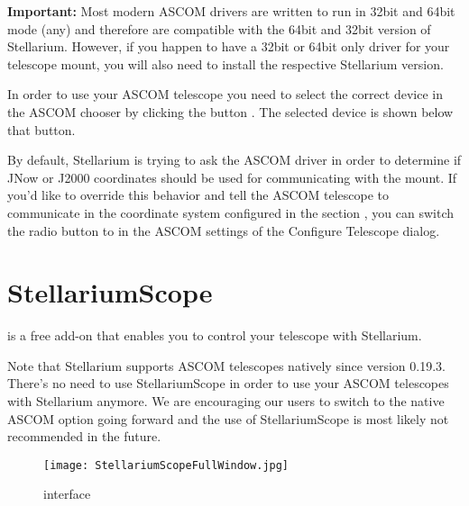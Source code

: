 \textbf{Important:} Most modern ASCOM drivers are written to run in 32bit and 64bit mode (any) and therefore are 
compatible with the 64bit and 32bit version of Stellarium. However, if you happen to have a 32bit or 64bit only
driver for your telescope mount, you will also need to install the respective Stellarium version.

In order to use your ASCOM telescope you need to select the correct device in the ASCOM chooser by clicking
the button . The selected device is shown below that button.

By default, Stellarium is trying to ask the ASCOM driver in order to determine if JNow or J2000 coordinates 
should be used for communicating with the mount. If you'd like to override this behavior and tell the ASCOM telescope
to communicate in the coordinate system configured in the section , you can
switch the radio button  to  in the ASCOM settings of 
the Configure Telescope dialog.

\section{StellariumScope}
\label{sec:plugins:StellariumScope}
 is a free add-on that enables you to control your telescope with Stellarium. 

Note that Stellarium supports ASCOM telescopes natively since version 0.19.3. There's no need to 
  use StellariumScope in order to use your ASCOM telescopes with Stellarium anymore. We are 
  encouraging our users to switch to the native ASCOM option going forward and the use of
  StellariumScope is most likely not recommended in the future.

\begin{figure}[htp]
\begin{center}
\texttt{[image: StellariumScopeFullWindow.jpg]}
\end{center}
\caption{ interface}
\label{fig:StellariumScopeFullWindow}
\end{figure}


